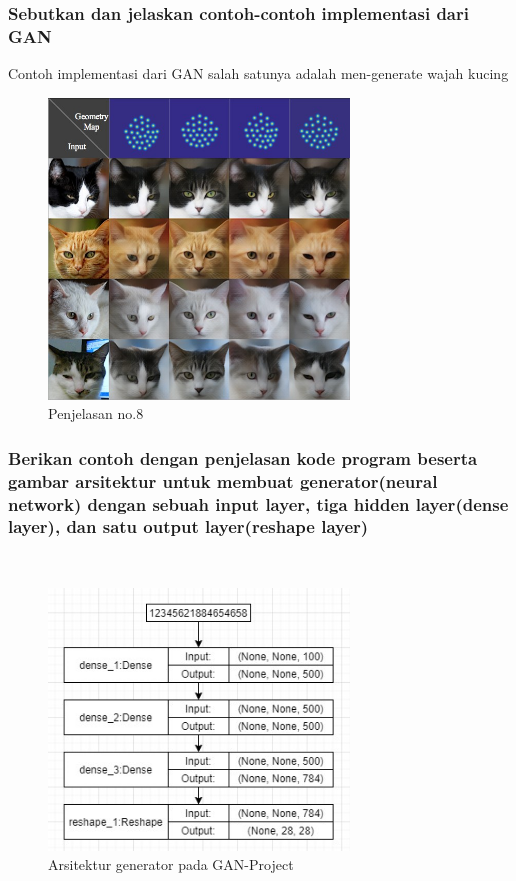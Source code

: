 \subsubsection{Sebutkan dan jelaskan contoh-contoh implementasi dari GAN}
\hfill\break
Contoh implementasi dari GAN salah satunya adalah men-generate wajah kucing
\begin{figure}[H]
	\centering
	\includegraphics[width=8cm]{figures/1174066/8/8.jpg}
	\caption{Penjelasan no.8}
\end{figure}

\subsubsection{Berikan contoh dengan penjelasan kode program beserta gambar arsitektur untuk membuat generator(neural network) dengan sebuah input layer, tiga hidden layer(dense layer), dan satu output layer(reshape layer)}
\hfill\\
\begin{figure}[H]
	\centering
	\includegraphics[width=8cm]{figures/1174066/8/3a.jpg}
	\caption{Arsitektur generator pada GAN-Project}
\end{figure}


